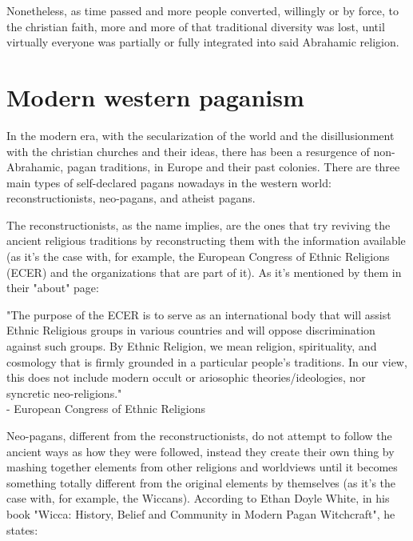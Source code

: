 Nonetheless, as time passed and more people converted, willingly or by force, to the christian faith,
more and more of that traditional diversity was lost, until virtually everyone was partially or fully
integrated into said Abrahamic religion.

\section{Modern western paganism}
In the modern era, with the secularization of the world and the disillusionment with the christian
churches and their ideas, there has been a resurgence of non-Abrahamic, pagan traditions, in Europe
and their past colonies. There are three main types of self-declared pagans nowadays in the western
world: reconstructionists, neo-pagans, and atheist pagans.

The reconstructionists, as the name implies, are the ones that try reviving the ancient religious
traditions by reconstructing them with the information available (as it's the case with, for example,
the European Congress of Ethnic Religions (ECER) and the organizations that are part of it).
As it's mentioned by them in their "about" page:

\begin{center}
    \itshape
    \parbox{0.7\textwidth}{
    "The purpose of the ECER is to serve as an international body that will assist Ethnic Religious
    groups in various countries and will oppose discrimination against such groups. By Ethnic Religion,
    we mean religion, spirituality, and cosmology that is firmly grounded in a particular people's
    traditions. In our view, this does not include modern occult or ariosophic theories/ideologies, nor
    syncretic neo-religions."\\
    \normalfont - European Congress of Ethnic Religions \cite{ECER}
    }
\end{center}

Neo-pagans, different from the reconstructionists, do not attempt to follow the ancient ways as how they
were followed, instead they create their own thing by mashing together elements from other religions and
worldviews until it becomes something totally different from the original elements by themselves (as it's
the case with, for example, the Wiccans). According to Ethan Doyle White, in his book "Wicca: History,
Belief and Community in Modern Pagan Witchcraft", he states:

